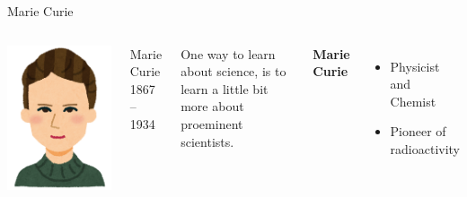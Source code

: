 \documentclass{beamer}
\begin{document}
\begin{CJK}{UTF8}{ipxm}
\begin{frame}{Marie Curie}
  \begin{columns}
  \includegraphics[width=1\textwidth]{../img/irasutoya_curie}
  \\
    \begin{center}
      Marie Curie\\ 1867 -- 1934
    \end{center}
    One way to learn about science, is to learn a little bit more about proeminent scientists.
    \bigskip

    {\bf Marie Curie}
    \begin{itemize}
      \item Physicist and Chemist
      \medskip

      \item Pioneer of radioactivity
      \medskip


\end{itemize}
\end{columns}
\end{frame}
\end{CJK}
\end{document}
